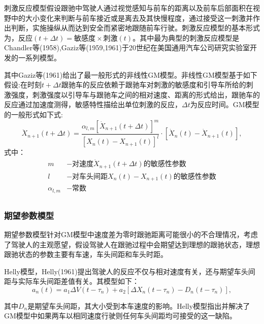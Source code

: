 刺激反应模型假设跟驰中驾驶人通过视觉感知与前车的距离以及前车后部面积在视野中的大小变化来判断与前车接近或是离去及其快慢程度，通过接受这一刺激并作出判断，实施操纵从而达到安全而紧密地跟随前车行驶。刺激反应模型的基本形式为，$\text{反应}(t+\Delta t)=\text{敏感度}{\times}\text{刺激}(t)$。其中最为典型的刺激反应模型是Chandler等(1958),Gaziz等(1959,1961)于20世纪在美国通用汽车公司研究实验室开发的一系列模型\cite{Chandler1958,Gazis1959,Gazis1961}。

其中Gaziz等(1961)给出了最一般形式的非线性GM模型\cite{Gazis1961}。非线性GM模型基于如下假设:在时刻$t+\Delta t$跟驰车的反应依赖于跟驰车对刺激的敏感度和引导车所给的刺激强度，刺激强度以引导车与跟驰车之间的相对速度、距离的形式给出，跟驰车的反应通过加速度测得，敏感特性描绘出单位刺激的反应，$\Delta t$为反应时间。GM模型的一般形式如下式:
\begin{equation}
\ddot{X}_{n+1}(t+\Delta t)=\frac{\alpha_{l,m}[\dot{X}_{n+1}(t+\Delta t)]^m}{[X_n(t)-X_{n+1}(t)]^l}\cdot [\dot{X}_n(t)-\dot{X}_{n+1}(t)],
\end{equation}
式中：
\begin{displaymath}
{\begin{aligned}
m&-\text{对速度}\dot{X}_{n+1}(t+\Delta t)\text{的敏感性参数}\\
l&-\text{对车头间距}X_n(t)-X_{n+1}(t)\text{的敏感性参数}\\
\alpha_{l,m}&-\text{常数}\\
\end{aligned}}
\end{displaymath}

\subsubsection{期望参数模型}
期望参数模型针对GM模型中速度差为零时跟驰距离可能很小的不合理情况，考虑了驾驶人的主观愿望，假设驾驶人在跟驰过程中会期望达到理想的跟驰状态，理想跟驰状态的参数主要有车速，车头间距和车头时距。

Helly模型，Helly(1961)提出驾驶人的反应不仅与相对速度有关，还与期望车头间距与实际车头间距差值有关\cite{Helly1961}。其模型如下：
\begin{equation}
a_n(t)=a_1\Delta V(t-\tau_n)+a_2[\Delta X_n(t-\tau_n)-D_n(t-\tau_n)],
\end{equation}

其中$D_n$是期望车头间距，其大小受到本车速度的影响。Helly模型指出并解决了GM模型中如果两车以相同速度行驶则任何车头间距均可接受的这一缺陷。

